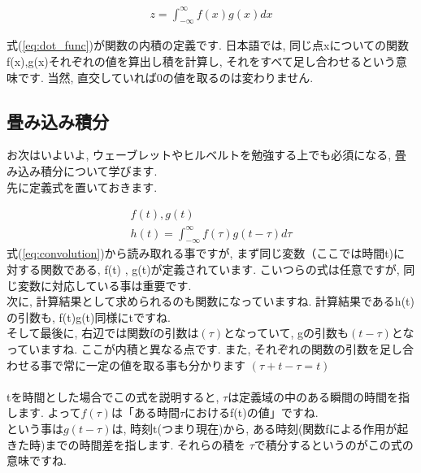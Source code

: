\documentclass[11pt,a4paper,uplatex]{ujreport}
\begin{document}
\begin{eqnarray}
\label{eq:dot_func}
z = \int^{\infty}_{-\infty} f(x)g(x)dx
\end{eqnarray}

式(\ref{eq:dot_func})が関数の内積の定義です. 日本語では, 同じ点xについての関数f(x),g(x)それぞれの値を算出し積を計算し, それをすべて足し合わせるという意味です. 当然, 直交していれば0の値を取るのは変わりません.


\subsection{畳み込み積分 \label{convolution}}
お次はいよいよ, ウェーブレットやヒルベルトを勉強する上でも必須になる, 畳み込み積分について学びます.\\
先に定義式を置いておきます.

\begin{eqnarray}
\label{eq:convolution}
f(t) , g(t)\\
h(t) = \int^{\infty}_{-\infty} f(\tau) g(t - \tau) d\tau
\end{eqnarray}
式(\ref{eq:convolution})から読み取れる事ですが, まず同じ変数（ここでは時間t)に対する関数である, f(t) , g(t)が定義されています. こいつらの式は任意ですが, 同じ変数に対応している事は重要です. \\
次に, 計算結果として求められるのも関数になっていますね. 計算結果であるh(t)の引数も, f(t)g(t)同様にtですね.\\
そして最後に, 右辺では関数fの引数は$(\tau)$となっていて, gの引数も$(t - \tau)$となっていますね. ここが内積と異なる点です. また, それぞれの関数の引数を足し合わせる事で常に一定の値を取る事も分かります $(\tau + t - \tau = t)$\\
\\
tを時間とした場合でこの式を説明すると, $\tau$は定義域の中のある瞬間の時間を指します. よって$f(\tau)$は「ある時間$\tau$におけるf(t)の値」ですね.\\
という事は$g(t-\tau)$は, 時刻t(つまり現在)から, ある時刻(関数fによる作用が起きた時)までの時間差を指します. それらの積を $\tau$で積分するというのがこの式の意味ですね.\\
\\
\\
\end{document}
